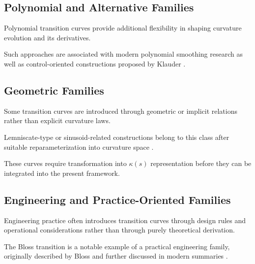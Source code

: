 \subsection{Polynomial and Alternative Families}

Polynomial transition curves provide additional flexibility in shaping
curvature evolution and its derivatives.

Such approaches are associated with modern polynomial smoothing research
\cite{ZboinskiWoznica2017Polynomial}
as well as control-oriented constructions proposed by Klauder
\cite{Klauder2001BetterWay,Klauder2009US}.


\subsection{Geometric Families}

Some transition curves are introduced through geometric or implicit
relations rather than explicit curvature laws.

\begin{example}
Lemniscate-type or sinusoid-related constructions belong to this class
after suitable reparameterization into curvature space
\cite{Pirti2016Transrapid}.
\end{example}

These curves require transformation into $\kappa(s)$ representation
before they can be integrated into the present framework.

\subsection{Engineering and Practice-Oriented Families}

Engineering practice often introduces transition curves through design
rules and operational considerations rather than through purely
theoretical derivation.

The Bloss transition is a notable example of a practical engineering
family, originally described by Bloss \cite{Bloss1978TrackGeometry}
and further discussed in modern summaries \cite{Ciobanu2015Bloss}.

